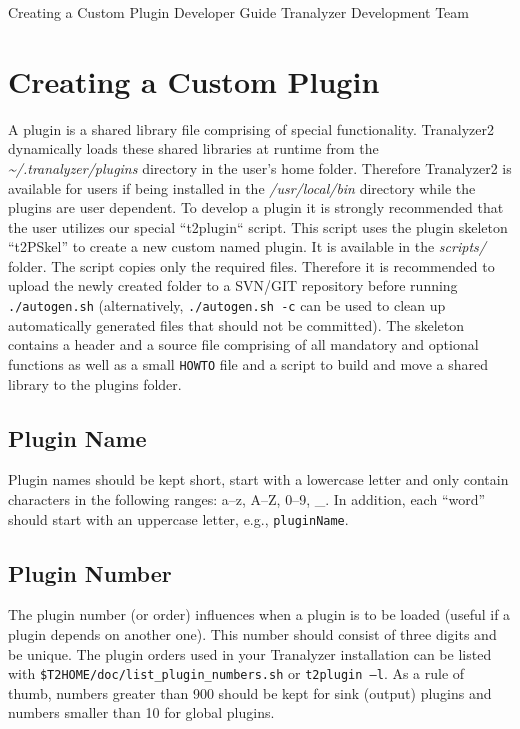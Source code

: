 \documentclass[documentation]{subfiles}
\begin{document}
\trantitle
    {Creating a Custom Plugin}
    {Developer Guide} %
    {Tranalyzer Development Team} %

\section{Creating a Custom Plugin}
A plugin is a shared library file comprising of special functionality. Tranalyzer2 dynamically loads these shared libraries at runtime from the {\em \textasciitilde{}/.tranalyzer/plugins} directory in the user's home folder. Therefore Tranalyzer2 is available for users if being installed in the {\em /usr/local/bin} directory while the plugins are user dependent. To develop a plugin it is strongly recommended that the user utilizes our special ``t2plugin`` script. This script uses the plugin skeleton ``t2PSkel'' to create a new custom named plugin. It is available in the {\em scripts/} folder. The script copies only the required files. Therefore it is recommended to upload the newly created folder to a SVN/GIT repository before running {\tt ./autogen.sh} (alternatively, {\tt ./autogen.sh -c} can be used to clean up automatically generated files that should not be committed). The skeleton contains a header and a source file comprising of all mandatory and optional functions as well as a small {\tt HOWTO} file and a script to build and move a shared library to the plugins folder.

\subsection{Plugin Name}
Plugin names should be kept short, start with a lowercase letter and only contain characters in the following ranges: {a--z, A--Z, 0--9, \_}.
In addition, each ``word'' should start with an uppercase letter, e.g., {\tt pluginName}.

\subsection{Plugin Number}
The plugin number (or order) influences when a plugin is to be loaded (useful if a plugin depends on another one).
This number should consist of three digits and be unique.
The plugin orders used in your Tranalyzer installation can be listed with {\tt \$T2HOME/doc/list\_plugin\_numbers.sh} or {\tt t2plugin --l}.
As a rule of thumb, numbers greater than 900 should be kept for sink (output) plugins and numbers smaller than 10 for global plugins.
\end{document}
